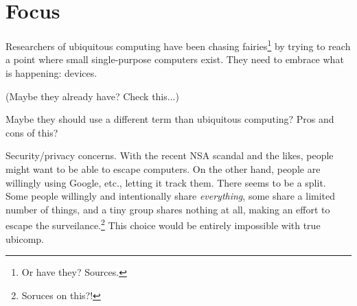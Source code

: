 \section{Focus}

Researchers of ubiquitous computing have been chasing fairies\footnote{Or have they? Sources.} by trying to reach
a point where small single-purpose computers exist. They need to embrace what is happening: devices.

(Maybe they already have? Check this...)

Maybe they should use a different term than ubiquitous computing? Pros and cons of this?

Security/privacy concerns. With the recent NSA scandal and the likes, people might want to be able to escape computers.
On the other hand, people are willingly using Google, etc., letting it track them. There seems to be a split. Some people
willingly and intentionally share \emph{everything}, some share a limited number of things, and a tiny group shares nothing
at all, making an effort to escape the surveilance.\footnote{Soruces on this?!} This choice would be entirely impossible
with true ubicomp.